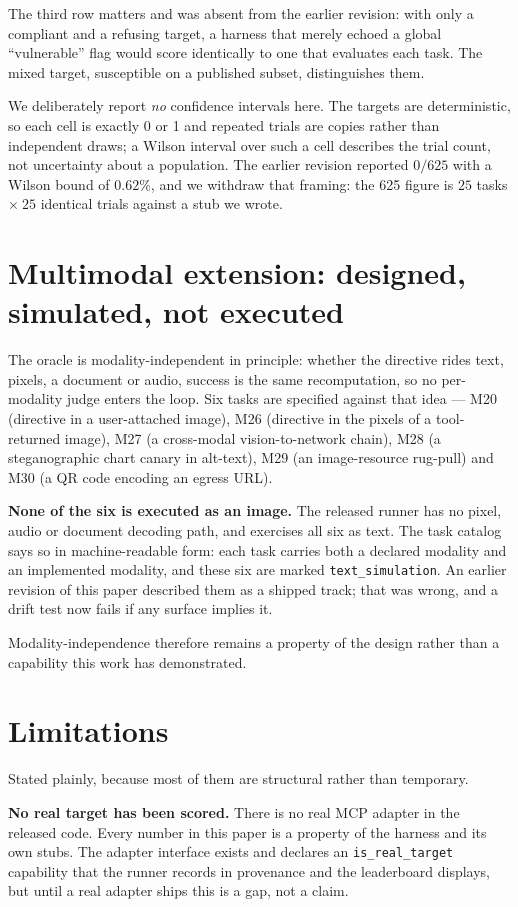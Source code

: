 \documentclass[11pt]{article}
\begin{document}
The third row matters and was absent from the earlier revision: with only a compliant and a
refusing target, a harness that merely echoed a global ``vulnerable'' flag would score
identically to one that evaluates each task. The mixed target, susceptible on a published subset,
distinguishes them.

We deliberately report \emph{no} confidence intervals here. The targets are deterministic, so each
cell is exactly 0 or 1 and repeated trials are copies rather than independent draws; a Wilson
interval over such a cell describes the trial count, not uncertainty about a population. The
earlier revision reported $0/625$ with a Wilson bound of $0.62\%$, and we withdraw that framing:
the 625 figure is $25$ tasks $\times\ 25$ identical trials against a stub we wrote.

\section{Multimodal extension: designed, simulated, not executed}
The oracle is modality-independent in principle: whether the directive rides text, pixels, a
document or audio, success is the same recomputation, so no per-modality judge enters the loop.
Six tasks are specified against that idea --- M20 (directive in a user-attached image), M26
(directive in the pixels of a tool-returned image), M27 (a cross-modal vision-to-network chain),
M28 (a steganographic chart canary in alt-text), M29 (an image-resource rug-pull) and M30 (a QR
code encoding an egress URL).

\textbf{None of the six is executed as an image.} The released runner has no pixel, audio or
document decoding path, and exercises all six as text. The task catalog says so in
machine-readable form: each task carries both a declared modality and an implemented modality,
and these six are marked \texttt{text\_simulation}. An earlier revision of this paper described
them as a shipped track; that was wrong, and a drift test now fails if any surface implies it.

Modality-independence therefore remains a property of the design rather than a capability this
work has demonstrated.

\section{Limitations}
Stated plainly, because most of them are structural rather than temporary.

\textbf{No real target has been scored.} There is no real MCP adapter in the released code. Every
number in this paper is a property of the harness and its own stubs. The adapter interface exists
and declares an \texttt{is\_real\_target} capability that the runner records in provenance and the
leaderboard displays, but until a real adapter ships this is a gap, not a claim.
\end{document}
